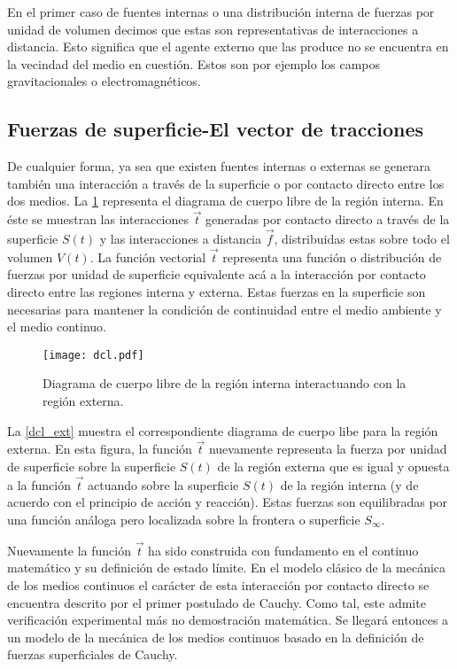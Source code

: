 \documentclass[../notas medios.tex]{subfiles}
\begin{document}
En el primer caso de fuentes internas o una distribución interna de fuerzas por
unidad de volumen decimos que estas son representativas de interacciones a
distancia. Esto significa que el agente externo que las produce no se encuentra
en la vecindad del medio en cuestión. Estos son por ejemplo los campos
gravitacionales o electromagnéticos.

\subsection{Fuerzas de superficie-El vector de tracciones}
De cualquier forma, ya sea que existen fuentes internas o externas se generara
también una interacción a través de la superficie o por contacto directo entre
los dos medios. La \cref{dcl_rep} representa el diagrama de cuerpo libre de la
región interna. En éste se muestran las interacciones $\vec t$ generadas por
contacto directo a través de la superficie $S(t)$ y las interacciones a
distancia $\vec f$, distribuidas estas sobre todo el volumen $V(t)$. La
función vectorial $\vec t$ representa una función o distribución de fuerzas por
unidad de superficie equivalente acá a la interacción por contacto directo entre
las regiones interna y externa. Estas fuerzas en la superficie son necesarias
para mantener la condición de continuidad entre el medio ambiente y el medio continuo.

\begin{figure}[H]
\centering
	\texttt{[image: dcl.pdf]}
	\caption{Diagrama de cuerpo libre de la región interna interactuando con la región externa.}
	\label{dcl_rep}
\end{figure}

La \cref{dcl_ext} muestra el correspondiente diagrama de cuerpo libe para la
región externa. En esta figura, la función $\vec t$ nuevamente representa la
fuerza por unidad de superficie sobre la superficie $S(t)$ de la región externa
que es igual y opuesta a la función $\vec t$ actuando sobre la superficie $S(t)$
de la región interna (y de acuerdo con el principio de acción y reacción). Estas
fuerzas son equilibradas por una función análoga pero localizada sobre la frontera o superficie ${S_\infty }$.

Nuevamente la función $\vec t$ ha sido construida con fundamento en el continuo
matemático y su definición de estado límite. En el modelo clásico de la mecánica
de los medios continuos el carácter de esta interacción por contacto directo se
encuentra descrito por el primer postulado de Cauchy.  Como tal, este admite
verificación experimental más no demostración matemática.  Se llegará entonces a
un modelo de la mecánica de los medios continuos basado en la definición de fuerzas superficiales de Cauchy.
\end{document}
